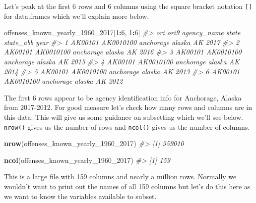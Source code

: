 \documentclass[
  12pt,
]{book}
\newenvironment{Shaded}{\begin{snugshade}}{\end{snugshade}}
\newcommand{\CommentTok}[1]{\textcolor[rgb]{0.37,0.37,0.37}{\textit{#1}}}
\newcommand{\DecValTok}[1]{\textcolor[rgb]{0.06,0.06,0.06}{#1}}
\newcommand{\KeywordTok}[1]{\textcolor[rgb]{0.27,0.27,0.27}{\textbf{#1}}}
\newcommand{\NormalTok}[1]{#1}
\newcommand{\OperatorTok}[1]{\textcolor[rgb]{0.43,0.43,0.43}{\textbf{#1}}}
\begin{document}
Let's peak at the first 6 rows and 6 columns using the square bracket notation \texttt{{[}{]}} for data.frames which we'll explain more below.

\begin{Shaded}
\begin{Highlighting}[]
\NormalTok{offenses\_known\_yearly\_}\DecValTok{1960}\NormalTok{\_}\DecValTok{2017}\NormalTok{[}\DecValTok{1}\OperatorTok{:}\DecValTok{6}\NormalTok{, }\DecValTok{1}\OperatorTok{:}\DecValTok{6}\NormalTok{]}
\CommentTok{\#\textgreater{}       ori      ori9 agency\_name  state state\_abb year}
\CommentTok{\#\textgreater{} 1 AK00101 AK0010100   anchorage alaska        AK 2017}
\CommentTok{\#\textgreater{} 2 AK00101 AK0010100   anchorage alaska        AK 2016}
\CommentTok{\#\textgreater{} 3 AK00101 AK0010100   anchorage alaska        AK 2015}
\CommentTok{\#\textgreater{} 4 AK00101 AK0010100   anchorage alaska        AK 2014}
\CommentTok{\#\textgreater{} 5 AK00101 AK0010100   anchorage alaska        AK 2013}
\CommentTok{\#\textgreater{} 6 AK00101 AK0010100   anchorage alaska        AK 2012}
\end{Highlighting}
\end{Shaded}

The first 6 rows appear to be agency identification info for Anchorage, Alaska from 2017-2012. For good measure let's check how many rows and columns are in this data. This will give us some guidance on subsetting which we'll see below. \texttt{nrow()} gives us the number of rows and \texttt{ncol()} gives us the number of columns.

\begin{Shaded}
\begin{Highlighting}[]
\KeywordTok{nrow}\NormalTok{(offenses\_known\_yearly\_}\DecValTok{1960}\NormalTok{\_}\DecValTok{2017}\NormalTok{)}
\CommentTok{\#\textgreater{} [1] 959010}
\end{Highlighting}
\end{Shaded}

\begin{Shaded}
\begin{Highlighting}[]
\KeywordTok{ncol}\NormalTok{(offenses\_known\_yearly\_}\DecValTok{1960}\NormalTok{\_}\DecValTok{2017}\NormalTok{)}
\CommentTok{\#\textgreater{} [1] 159}
\end{Highlighting}
\end{Shaded}

This is a large file with 159 columns and nearly a million rows. Normally we wouldn't want to print out the names of all 159 columns but let's do this here as we want to know the variables available to subset.
\end{document}
